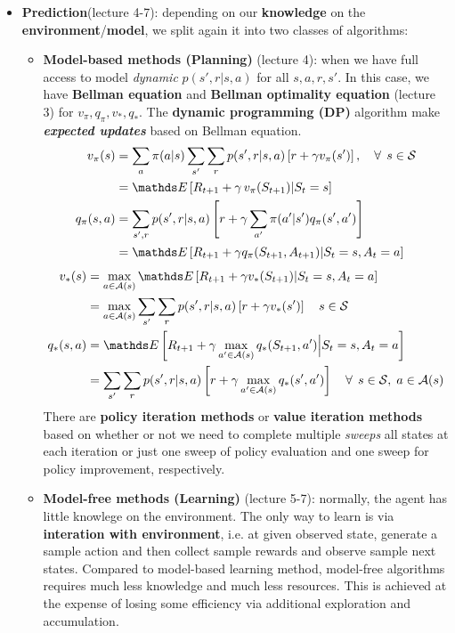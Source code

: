 \documentclass[11pt]{article}
\begin{document}
\begin{itemize}
\item \textbf{Prediction}(lecture 4-7): depending on our \textbf{knowledge} on the \textbf{environment}/\textbf{model}, we split again it into two classes of algorithms:
\begin{itemize}
\item \textbf{Model-based methods (Planning)} (lecture 4): when we have full access to model \emph{dynamic} $p(s', r|s, a)$ for all $s,a,r,s'$. In this case, we have \textbf{Bellman equation} and \textbf{Bellman optimality equation} (lecture 3) for $v_{\pi}, q_{\pi}, v_{*}, q_{*}$. The \textbf{dynamic programming (DP)} algorithm make \textbf{\emph{expected updates}} based on Bellman equation. 
\begin{align}
v_{\pi}(s) &=  \sum_{a}\pi(a|s)\sum_{s'}\sum_{r}p(s', r| s, a)\brac{r + \gamma v_{\pi}(s')}, \quad \forall\,\; s\in \cS \label{eqn: bellman_eqn_value} \\
&= \E{}{R_{t+1}  + \gamma\,v_{\pi}(S_{t+1}) | S_{t} = s} \label{eqn: bellman_eqn_value3}\\
q_{\pi}(s, a) &=\sum_{s', r}p(s', r|s,a)\brac{r+ \gamma \sum_{a'}\pi(a'|s')q_{\pi}(s', a')} \label{eqn: bellman_eqn_value_action}\\
&=\E{}{R_{t+1} + \gamma q_{\pi}(S_{t+1}, A_{t+1}) | S_{t}=s, A_{t}=a}  \label{eqn: bellman_eqn_value_action_3}
\end{align}
\begin{align}
v_{*}(s) &=  \max_{a\in \cA(s)}\E{}{R_{t+1} + \gamma v_{*}(S_{t+1}) | S_{t}=s, A_{t}=a} \label{eqn: bellman_eqn_optimal_value3}\\
&= \max_{a\in \cA(s)}\sum_{s'}\sum_{r}p(s', r|s, a)\brac{r + \gamma v_{*}(s')} \quad s\in \cS \label{eqn: bellman_eqn_optimal_value2} \\
q_{*}(s, a) &=  \E{}{R_{t+1} + \gamma \max_{a'\in \cA(s)}q_{*}(S_{t+1}, a') \Big| S_{t}=s, A_{t}=a} \label{eqn: bellman_eqn_optimal_value_action3}\\
&=\sum_{s'}\sum_{r}p(s', r|s, a)\brac{r + \gamma  \max_{a'\in \cA(s)}q_{*}(s', a')} \quad \forall\,\; s\in \cS, \; a\in \cA(s) \label{eqn: bellman_eqn_optimal_value_action2}
\end{align} There are \textbf{policy iteration methods} or \textbf{value iteration methods} based on whether or not we need to complete multiple \emph{sweeps} all states at each iteration or just one sweep of policy evaluation and one sweep for policy improvement, respectively. 

\item \textbf{Model-free methods (Learning)} (lecture 5-7): normally, the agent has little knowlege on the environment. The only way to learn is via \textbf{interation with environment}, i.e. at given observed state, generate a sample action and then collect sample rewards and observe sample next states. Compared to model-based learning method, model-free algorithms requires much less knowledge and much less resources. This is achieved at the expense of losing some efficiency via additional exploration  and accumulation.


\end{itemize}
\end{itemize}
\end{document}
